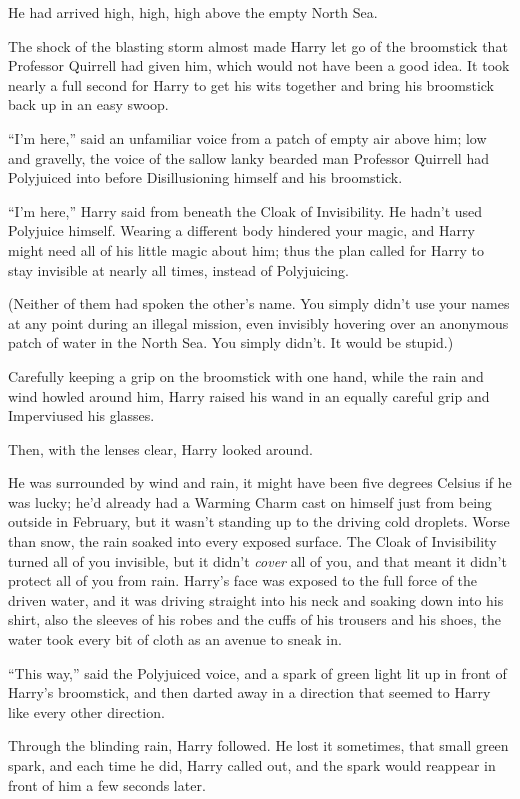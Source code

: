 He had arrived high, high, high above the empty North Sea.

The shock of the blasting storm almost made Harry let go of the broomstick that Professor Quirrell had given him, which would not have been a good idea. It took nearly a full second for Harry to get his wits together and bring his broomstick back up in an easy swoop.

“I’m here,” said an unfamiliar voice from a patch of empty air above him; low and gravelly, the voice of the sallow lanky bearded man Professor Quirrell had Polyjuiced into before Disillusioning himself and his broomstick.

“I’m here,” Harry said from beneath the Cloak of Invisibility. He hadn’t used Polyjuice himself. Wearing a different body hindered your magic, and Harry might need all of his little magic about him; thus the plan called for Harry to stay invisible at nearly all times, instead of Polyjuicing.

(Neither of them had spoken the other’s name. You simply didn’t use your names at any point during an illegal mission, even invisibly hovering over an anonymous patch of water in the North Sea. You simply didn’t. It would be stupid.)

Carefully keeping a grip on the broomstick with one hand, while the rain and wind howled around him, Harry raised his wand in an equally careful grip and Imperviused his glasses.

Then, with the lenses clear, Harry looked around.

He was surrounded by wind and rain, it might have been five degrees Celsius if he was lucky; he’d already had a Warming Charm cast on himself just from being outside in February, but it wasn’t standing up to the driving cold droplets. Worse than snow, the rain soaked into every exposed surface. The Cloak of Invisibility turned all of you invisible, but it didn’t \emph{cover} all of you, and that meant it didn’t protect all of you from rain. Harry’s face was exposed to the full force of the driven water, and it was driving straight into his neck and soaking down into his shirt, also the sleeves of his robes and the cuffs of his trousers and his shoes, the water took every bit of cloth as an avenue to sneak in.

“This way,” said the Polyjuiced voice, and a spark of green light lit up in front of Harry’s broomstick, and then darted away in a direction that seemed to Harry like every other direction.

Through the blinding rain, Harry followed. He lost it sometimes, that small green spark, and each time he did, Harry called out, and the spark would reappear in front of him a few seconds later.

